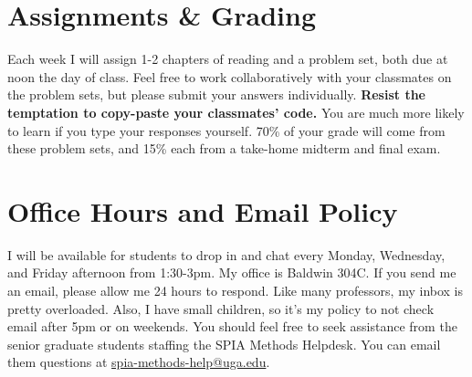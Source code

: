 \documentclass[11pt, letterpaper]{article}
\begin{document}
%
%
%
%

\section*{Assignments \& Grading}

Each week I will assign 1-2 chapters of reading and a problem set, both due at noon the day of class. Feel free to work collaboratively with your classmates on the problem sets, but please submit your answers individually. \textbf{Resist the temptation to copy-paste your classmates' code.} You are much more likely to learn if you type your responses yourself. 70\% of your grade will come from these problem sets, and 15\% each from a take-home midterm and final exam.

\section*{Office Hours and Email Policy}
I will be available for students to drop in and chat every Monday, Wednesday, and Friday afternoon from 1:30-3pm. My office is Baldwin 304C. If you send me an email, please allow me 24 hours to respond. Like many professors, my inbox is pretty overloaded. Also, I have small children, so it's my policy to not check email after 5pm or on weekends. You should feel free to seek assistance from the senior graduate students staffing the SPIA Methods Helpdesk. You can email them questions at \href{mailto:spia-methods-help@uga.edu}{spia-methods-help@uga.edu}.
\end{document}
